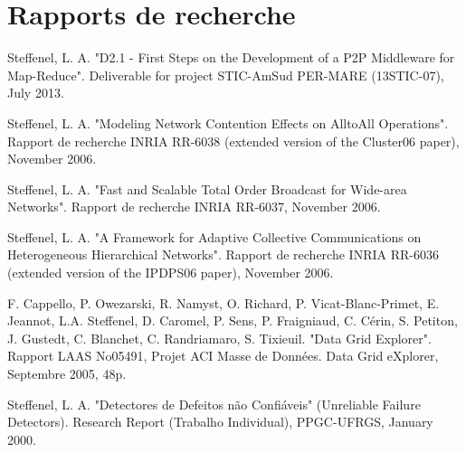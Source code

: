 \documentclass[final,twoside]{hdr} %
\begin{document}
\section*{Rapports de recherche}

Steffenel, L. A. "D2.1 - First Steps on the Development of a P2P Middleware for Map-Reduce". Deliverable for project STIC-AmSud PER-MARE (13STIC-07), July 2013. 

Steffenel, L. A. "Modeling Network Contention Effects on AlltoAll Operations". Rapport de recherche INRIA RR-6038 (extended version of the Cluster06 paper), November 2006. 

Steffenel, L. A. "Fast and Scalable Total Order Broadcast for Wide-area Networks". Rapport de recherche INRIA RR-6037, November 2006. 

Steffenel, L. A. "A Framework for Adaptive Collective Communications on Heterogeneous Hierarchical Networks". Rapport de recherche INRIA RR-6036 (extended version of the IPDPS06 paper), November 2006.

F. Cappello, P. Owezarski, R. Namyst, O. Richard, P. Vicat-Blanc-Primet, E. Jeannot, L.A. Steffenel, D. Caromel, P. Sens, P. Fraigniaud, C. Cérin, S. Petiton, J. Gustedt, C. Blanchet, C. Randriamaro, S. Tixieuil. "Data Grid Explorer". Rapport LAAS No05491, Projet ACI Masse de Données. Data Grid eXplorer, Septembre 2005, 48p. 

Steffenel, L. A. "Detectores de Defeitos não Confiáveis" (Unreliable Failure Detectors). Research Report (Trabalho Individual), PPGC-UFRGS, January 2000. 






\end{document}
